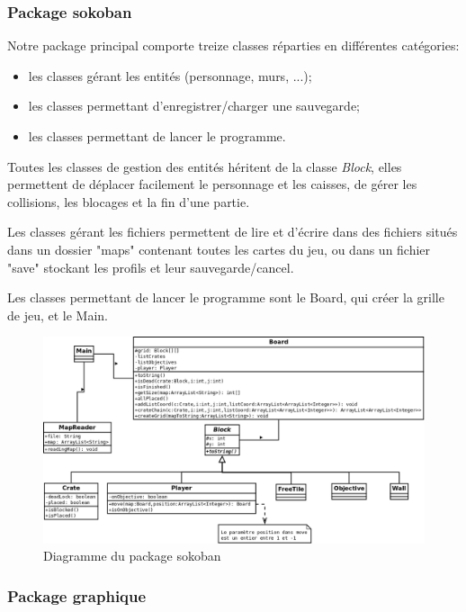 \documentclass[a4paper,12pt]{article} %
\begin{document}
\subsubsection{Package sokoban}

Notre package principal comporte treize classes réparties en différentes catégories:
\begin{itemize}
\item les classes gérant les entités (personnage, murs, ...);
\item les classes permettant d'enregistrer/charger une sauvegarde;
\item les classes permettant de lancer le programme.
\end{itemize}

Toutes les classes de gestion des entités héritent de la classe \textit{Block}, elles permettent de déplacer facilement le personnage et les caisses, de gérer les collisions, les blocages et la fin d'une partie.

Les classes gérant les fichiers permettent de lire et d'écrire dans des fichiers situés dans un dossier "maps" contenant toutes les cartes du jeu, ou dans un fichier "save" stockant les profils et leur sauvegarde/cancel.

Les classes permettant de lancer le programme sont le Board, qui créer la grille de jeu, et le Main.

\begin{figure}[!h]
\centering
\includegraphics[scale=0.5]{images/diag_sokoban.png}
\caption{Diagramme du package sokoban}
\end{figure}

\subsubsection{Package graphique}
\end{document}

